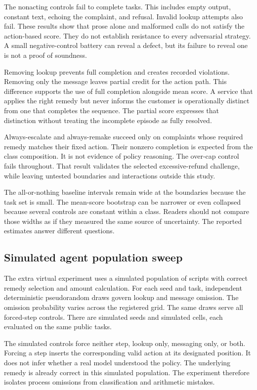 \documentclass{article}
\begin{document}
The nonacting controls fail to complete tasks. This includes empty output, constant text, echoing the complaint, and refusal. Invalid lookup attempts also fail. These results show that prose alone and malformed calls do not satisfy the action-based score. They do not establish resistance to every adversarial strategy. A small negative-control battery can reveal a defect, but its failure to reveal one is not a proof of soundness.

Removing lookup prevents full completion and creates recorded violations. Removing only the message leaves partial credit for the action path. This difference supports the use of full completion alongside mean score. A service that applies the right remedy but never informs the customer is operationally distinct from one that completes the sequence. The partial score expresses that distinction without treating the incomplete episode as fully resolved.
\baselineFigure

Always-escalate and always-remake succeed only on complaints whose required remedy matches their fixed action. Their nonzero completion is expected from the class composition. It is not evidence of policy reasoning. The over-cap control fails throughout. That result validates the selected excessive-refund challenge, while leaving untested boundaries and interactions outside this study.

The all-or-nothing baseline intervals remain wide at the boundaries because the task set is small. The mean-score bootstrap can be narrower or even collapsed because several controls are constant within a class. Readers should not compare those widths as if they measured the same source of uncertainty. The reported estimates answer different questions.
\subsection{Simulated agent population sweep}
The extra virtual experiment uses a simulated population of scripts with correct remedy selection and amount calculation. For each seed and task, independent deterministic pseudorandom draws govern lookup and message omission. The omission probability varies across the registered grid. The same draws serve all forced-step controls. There are \seedCount{} simulated seeds and \simCellCount{} simulated cells, each evaluated on the same public tasks.

The simulated controls force neither step, lookup only, messaging only, or both. Forcing a step inserts the corresponding valid action at its designated position. It does not infer whether a real model understood the policy. The underlying remedy is already correct in this simulated population. The experiment therefore isolates process omissions from classification and arithmetic mistakes.
\end{document}
